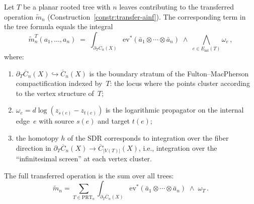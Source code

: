 \begin{proposition}
\label{prop:trees-boundary-strata}
Let $T$ be a planar rooted tree with $n$ leaves contributing to the
transferred operation $\tilde{m}_n$
(Construction~\ref{constr:transfer-ainf}). The corresponding
term in the tree formula equals the integral
\[
\tilde{m}_n^T(a_1, \ldots, a_n) \;=\;
\int_{\partial_T \overline{C}_n(X)}
\mathrm{ev}^*(\bar{a}_1 \otimes \cdots \otimes \bar{a}_n)
\;\wedge\;
\bigwedge_{e \in E_{\mathrm{int}}(T)} \omega_e\,,
\]
where:
\begin{enumerate}[label=(\roman*)]
\item $\partial_T \overline{C}_n(X) \hookrightarrow
\overline{C}_n(X)$ is the boundary stratum of the
Fulton--MacPherson compactification indexed by~$T$: the locus
where the points cluster according to the vertex structure of~$T$;
\item $\omega_e = d\log(z_{s(e)} - z_{t(e)})$ is the logarithmic
propagator on the internal edge~$e$ with source $s(e)$ and
target $t(e)$;
\item the homotopy $h$ of the SDR corresponds to integration over
the fiber direction in $\partial_T\overline{C}_n(X) \to
\overline{C}_{|V(T)|}(X)$, i.e., integration over the
``infinitesimal screen'' at each vertex cluster.
\end{enumerate}
The full transferred operation is the sum over all trees:
\[
\tilde{m}_n = \sum_{T \in \mathrm{PRT}_n}
\int_{\partial_T \overline{C}_n(X)}
\mathrm{ev}^*(\bar{a}_1 \otimes \cdots \otimes \bar{a}_n)
\;\wedge\;\omega_T\,.
\]
\end{proposition}

